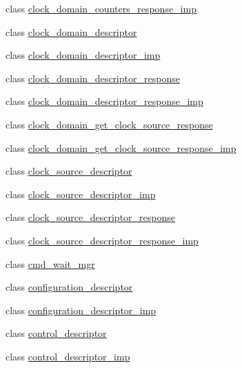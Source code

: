 \begin{DoxyCompactItemize}
\item 
class \hyperlink{classavdecc__lib_1_1clock__domain__counters__response__imp}{clock\+\_\+domain\+\_\+counters\+\_\+response\+\_\+imp}
\item 
class \hyperlink{classavdecc__lib_1_1clock__domain__descriptor}{clock\+\_\+domain\+\_\+descriptor}
\item 
class \hyperlink{classavdecc__lib_1_1clock__domain__descriptor__imp}{clock\+\_\+domain\+\_\+descriptor\+\_\+imp}
\item 
class \hyperlink{classavdecc__lib_1_1clock__domain__descriptor__response}{clock\+\_\+domain\+\_\+descriptor\+\_\+response}
\item 
class \hyperlink{classavdecc__lib_1_1clock__domain__descriptor__response__imp}{clock\+\_\+domain\+\_\+descriptor\+\_\+response\+\_\+imp}
\item 
class \hyperlink{classavdecc__lib_1_1clock__domain__get__clock__source__response}{clock\+\_\+domain\+\_\+get\+\_\+clock\+\_\+source\+\_\+response}
\item 
class \hyperlink{classavdecc__lib_1_1clock__domain__get__clock__source__response__imp}{clock\+\_\+domain\+\_\+get\+\_\+clock\+\_\+source\+\_\+response\+\_\+imp}
\item 
class \hyperlink{classavdecc__lib_1_1clock__source__descriptor}{clock\+\_\+source\+\_\+descriptor}
\item 
class \hyperlink{classavdecc__lib_1_1clock__source__descriptor__imp}{clock\+\_\+source\+\_\+descriptor\+\_\+imp}
\item 
class \hyperlink{classavdecc__lib_1_1clock__source__descriptor__response}{clock\+\_\+source\+\_\+descriptor\+\_\+response}
\item 
class \hyperlink{classavdecc__lib_1_1clock__source__descriptor__response__imp}{clock\+\_\+source\+\_\+descriptor\+\_\+response\+\_\+imp}
\item 
class \hyperlink{classavdecc__lib_1_1cmd__wait__mgr}{cmd\+\_\+wait\+\_\+mgr}
\item 
class \hyperlink{classavdecc__lib_1_1configuration__descriptor}{configuration\+\_\+descriptor}
\item 
class \hyperlink{classavdecc__lib_1_1configuration__descriptor__imp}{configuration\+\_\+descriptor\+\_\+imp}
\item 
class \hyperlink{classavdecc__lib_1_1control__descriptor}{control\+\_\+descriptor}
\item 
class \hyperlink{classavdecc__lib_1_1control__descriptor__imp}{control\+\_\+descriptor\+\_\+imp}
\item 

\end{DoxyCompactItemize}
